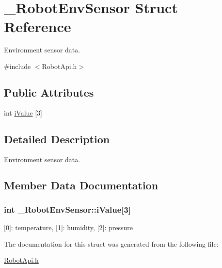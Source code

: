 \hypertarget{struct__RobotEnvSensor}{\section{\+\_\+\+Robot\+Env\+Sensor Struct Reference}
\label{struct__RobotEnvSensor}
}


Environment sensor data.  




{\ttfamily \#include $<$Robot\+Api.\+h$>$}

\subsection*{Public Attributes}
\begin{DoxyCompactItemize}
\item 
int \hyperlink{struct__RobotEnvSensor_a43ada67fc341dfdadbad4b3c287cf3f4}{i\+Value} \mbox{[}3\mbox{]}
\end{DoxyCompactItemize}


\subsection{Detailed Description}
Environment sensor data. 

\subsection{Member Data Documentation}
\hypertarget{struct__RobotEnvSensor_a43ada67fc341dfdadbad4b3c287cf3f4}{
\subsubsection[{i\+Value}]{\setlength{\rightskip}{0pt plus 5cm}int \+\_\+\+Robot\+Env\+Sensor\+::i\+Value\mbox{[}3\mbox{]}}}\label{struct__RobotEnvSensor_a43ada67fc341dfdadbad4b3c287cf3f4}
\mbox{[}0\mbox{]}\+: temperature, \mbox{[}1\mbox{]}\+: humidity, \mbox{[}2\mbox{]}\+: pressure 

The documentation for this struct was generated from the following file\+:\begin{DoxyCompactItemize}
\item 
\hyperlink{RobotApi_8h}{Robot\+Api.\+h}\end{DoxyCompactItemize}
